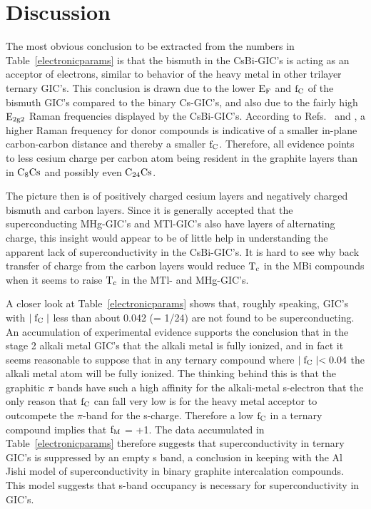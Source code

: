 \section{Discussion}
\label{csbidisc}

	The  most  obvious conclusion to  be extracted from the numbers  in
Table~\ref{electronicparams}  is  that the bismuth   in the  CsBi-GIC's  is
acting as an acceptor of electrons, similar to behavior of the  heavy metal
in other trilayer ternary GIC's.   This conclusion is drawn  due to the lower
$\rm  E_F$  and $\rm f_C$   of the bismuth  GIC's compared  to the   binary
Cs-GIC's, and also due to the fairly high $\rm  E_{2g2}$  Raman frequencies
displayed by the  CsBi-GIC's.\cite{yang88} According to Refs.~\cite{chan87}
and
\cite{pietronero78}, a higher Raman  frequency  for donor compounds is indicative of a  smaller
in-plane  carbon-carbon   distance  and   thereby a   smaller   $\rm  f_C$.
Therefore, all evidence points to less cesium charge  per carbon atom being
resident in the graphite layers than in $\rm C_8Cs$  and possibly even $\rm
C_{24}Cs$.

	The  pic\-ture then  is   of  pos\-i\-tive\-ly charged   ces\-ium  lay\-ers and
neg\-a\-tive\-ly  charged bis\-muth  and  carbon layers.   Since it  is   generally
accepted that the superconducting MHg-GIC's and  MTl-GIC's also have layers
of alternating charge\cite{herold81},  this insight would  appear  to be of
little help in understanding the apparent  lack of superconductivity in the
CsBi-GIC's.  It is hard to see why back transfer of charge from  the carbon
layers would reduce $\rm  T_c$ in the MBi compounds  when it seems to raise
$\rm T_c$ in the MTl- and MHg-GIC's.

	A closer look  at Table~\ref{electronicparams} shows that,  roughly
speaking, GIC's with $\rm \mid f_C \mid$ less than about 0.042 (= 1/24) are
not  found   to   be superconducting.    An  accumulation  of  experimental
evidence\cite{fretigny85,doll87,I63,preil84}  supports  the conclusion that
in the stage 2 alkali metal GIC's that the  alkali metal  is fully ionized,
and in fact it  seems reasonable to  suppose that in  any ternary  compound
where $\rm \mid  f_C \mid <  0.04 $ the  alkali metal  atom will  be  fully
ionized.  The thinking  behind this is that  the graphitic $\pi$ bands have
such a high affinity for the  alkali-metal s-electron  that the only reason
that  $\rm f_C$  can fall  very low  is for  the heavy  metal  acceptor  to
outcompete the $\pi$-band for the s-charge.  Therefore a low $\rm f_C$ in a
ternary compound  implies  that $\rm f_M$ =   +1.  The  data accumulated in
Table~\ref{electronicparams} therefore  suggests  that superconductivity in
ternary GIC's  is suppressed by an  empty  s band, a conclusion  in keeping
with the Al Jishi model\cite{M143} of  superconductivity in binary graphite
intercalation   compounds.  This model  suggests  that s-band  occupancy is
necessary  for  superconductivity in  GIC's.   

